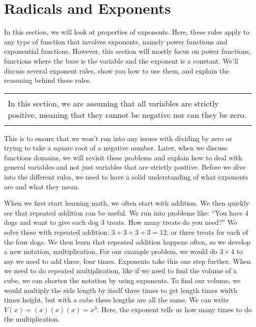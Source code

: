 \section{Radicals and Exponents}\label{sec:exponents}

In this section, we will look at properties of exponents. Here, these rules apply to any type of function that involves exponents, namely power functions and exponential functions. However, this section will mostly focus on power functions, functions where the base is the variable and the exponent is a constant. We'll discuss several exponent rules, show you how to use them, and explain the reasoning behind these rules. 
	\begin{center}
		\begin{tabular}{| p{3.56in} |} \hline
			\\[-4pt]
			In this section, we are assuming that all variables are strictly positive, meaning that they cannot be negative nor can they be zero.\\[-4pt]
			\\\hline
		\end{tabular}
	\end{center} 
This is to ensure that we won't run into any issues with dividing by zero or trying to take a square root of a negative number. Later, when we discuss functions domains, we will revisit these problems and explain how to deal with general variables and not just variables that are strictly positive. Before we dive into the different rules, we need to have a solid understanding of what exponents are and what they mean.

When we first start learning math, we often start with addition. We then quickly see that repeated addition can be useful. We run into problems like: ``You have 4 dogs and want to give each dog 3 treats. How many treats do you need?'' We solve these with repeated addition: $3+3+3+3 = 12$, or three treats for each of the four dogs. We then learn that repeated addition happens often, so we develop a new notation, multiplication. For our example problem, we would do $3 \times 4$ to say we need to add three, four times. Exponents take this one step further. When we need to do repeated multiplication, like if we need to find the volume of a cube, we can shorten the notation by using exponents. To find our volume, we would multiply the side length by itself three times to get length times width times height, but with a cube these lengths are all the same. We can write $V(x) = (x)(x)(x)=x^3$. Here, the exponent tells us how many times to do the multiplication.

